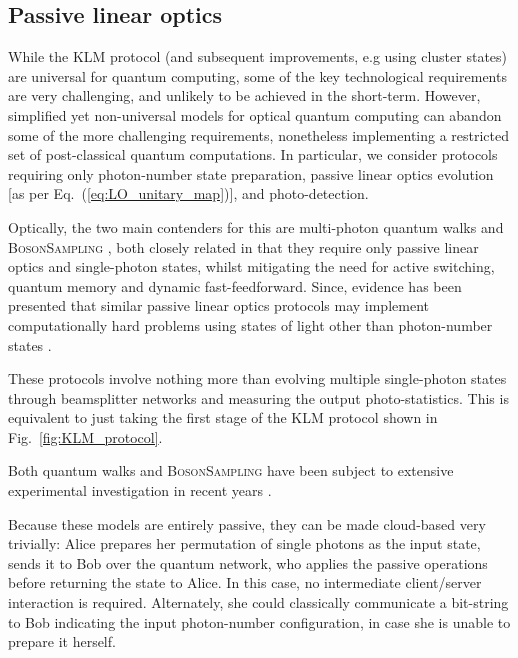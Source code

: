 \documentclass[aps,rmp,twocolumn,amsmath,amssymb,nofootinbib,superscriptaddress,longbibliography,floatfix,table-of-contents,eqsecnum]{revtex4-1}
\newcommand{\comment}[1]{{\color{blue}{\textbf{#1}}}}
\begin{document}
\comment{To do! Bill Munro perhaps?}

%
%

\subsection{Passive linear optics} \label{sec:passive_LO} 

While the KLM protocol (and subsequent improvements, e.g using cluster states) are universal for quantum computing, some of the key technological requirements are very challenging, and unlikely to be achieved in the short-term. However, simplified yet non-universal models for optical quantum computing can abandon some of the more challenging requirements, nonetheless implementing a restricted set of post-classical quantum computations. In particular, we consider protocols requiring only photon-number state preparation, passive linear optics evolution [as per Eq.~(\ref{eq:LO_unitary_map})], and photo-detection.

Optically, the two main contenders for this are multi-photon quantum walks \cite{bib:Aharonov93, bib:Aharonov01, bib:Kempe03, bib:Childs09, bib:Salvador12, bib:RohdeMultiWalk11} and \textsc{BosonSampling} \cite{bib:AaronsonArkhipov10, bib:RohdeIntroBS15}, both closely related in that they require only passive linear optics and single-photon states, whilst mitigating the need for active switching, quantum memory and dynamic fast-feedforward. Since, evidence has been presented that similar passive linear optics protocols may implement computationally hard problems using states of light other than photon-number states \cite{bib:RandBS, bib:RohdePhotAdd15, bib:RohdeDisp15, bib:RohdeCat15}.

These protocols involve nothing more than evolving multiple single-photon states through beamsplitter networks and measuring the output photo-statistics. This is equivalent to just taking the first stage of the KLM protocol shown in Fig.~\ref{fig:KLM_protocol}.

Both quantum walks and \textsc{BosonSampling} have been subject to extensive experimental investigation in recent years \cite{bib:PeruzzoQW, bib:Broome10, bib:Schreiber11b, bib:Owens11, bib:RohdeQWExp12, bib:Broome2012, bib:RohdeQWExp12, bib:Spring2, bib:Crespi3, bib:Tillmann4}.

Because these models are entirely passive, they can be made cloud-based very trivially: Alice prepares her permutation of single photons as the input state, sends it to Bob over the quantum network, who applies the passive operations before returning the state to Alice. In this case, no intermediate client/server interaction is required. Alternately, she could classically communicate a bit-string to Bob indicating the input photon-number configuration, in case she is unable to prepare it herself.
\end{document}
